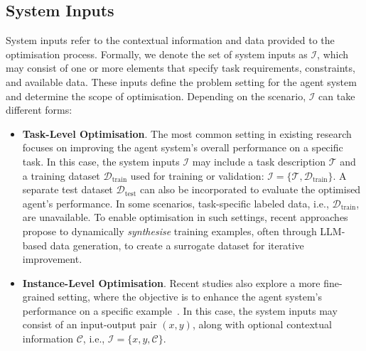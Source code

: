 \documentclass[]{selfevolagent}
\theoremstyle{plain}
\theoremstyle{definition}
\theoremstyle{remark}
\begin{document}
\subsection{System Inputs}
System inputs refer to the contextual information and data provided to the optimisation process. 
Formally, we denote the set of system inputs as $\mathcal{I}$, which may consist of one or more elements that specify task requirements, constraints, and available data. These inputs define the problem setting for the agent system and determine the scope of optimisation. 
Depending on the scenario, $\mathcal{I}$ can take different forms: 
\begin{itemize}
    \item \textbf{Task-Level Optimisation}. The most common setting in existing research focuses on improving the agent system's overall performance on a specific task. In this case, the system inputs $\mathcal{I}$ may include a task description $\mathcal{T}$ and a training dataset $\mathcal{D}_{\text{train}}$ used for training or validation: $\mathcal{I} = \{\mathcal{T}, \mathcal{D}_{\text{train}}\}$. A separate test dataset $\mathcal{D}_{\text{test}}$ can also be incorporated to evaluate the optimised agent's performance. In some scenarios, task-specific labeled data, i.e., $\mathcal{D}_{\text{train}}$, are unavailable. To enable optimisation in such settings, recent approaches~\citep{huang2025rzero,zhao2025absolute,liu2025spiral} propose to dynamically \textit{synthesise} training examples, often through LLM-based data generation, to create a surrogate dataset for iterative improvement. 
    \item \textbf{Instance-Level Optimisation}. Recent studies also explore a more fine-grained setting, where the objective is to enhance the agent system's performance on a specific example~\citep{sun2024query,novikov2025alphaevolve}. In this case, the system inputs may consist of an input-output pair $(x, y)$, along with optional contextual information $\mathcal{C}$, i.e., $\mathcal{I} = \{x, y, \mathcal{C}\}$. 
\end{itemize}
\end{document}
